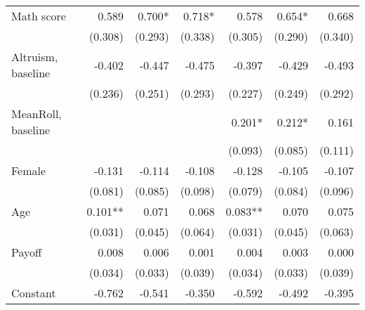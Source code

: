 \begin{table}[htbp]
\begin{adjustbox}{width=1\textwidth}
\begin{threeparttable}
\begin{tabular}{l*{6}{D{.}{.}{-1}}}
\midrule
Math score          &               0.589   &               0.700*  &               0.718*  &               0.578   &               0.654*  &               0.668   \\
                    &             (0.308)   &             (0.293)   &             (0.338)   &             (0.305)   &             (0.290)   &             (0.340)   \\
Altruism, baseline  &              -0.402   &              -0.447   &              -0.475   &              -0.397   &              -0.429   &              -0.493   \\
                    &             (0.236)   &             (0.251)   &             (0.293)   &             (0.227)   &             (0.249)   &             (0.292)   \\
MeanRoll, baseline  &                       &                       &                       &               0.201*  &               0.212*  &               0.161   \\
                    &                       &                       &                       &             (0.093)   &             (0.085)   &             (0.111)   \\
Female              &              -0.131   &              -0.114   &              -0.108   &              -0.128   &              -0.105   &              -0.107   \\
                    &             (0.081)   &             (0.085)   &             (0.098)   &             (0.079)   &             (0.084)   &             (0.096)   \\
Age                 &               0.101** &               0.071   &               0.068   &               0.083** &               0.070   &               0.075   \\
                    &             (0.031)   &             (0.045)   &             (0.064)   &             (0.031)   &             (0.045)   &             (0.063)   \\
Payoff              &               0.008   &               0.006   &               0.001   &               0.004   &               0.003   &               0.000   \\
                    &             (0.034)   &             (0.033)   &             (0.039)   &             (0.034)   &             (0.033)   &             (0.039)   \\
Constant            &              -0.762   &              -0.541   &              -0.350   &              -0.592   &              -0.492   &              -0.395   \\

\end{tabular}
\end{threeparttable}
\end{adjustbox}
\end{table}
